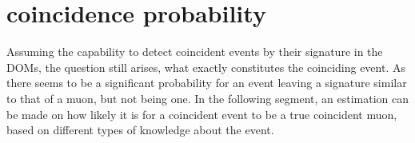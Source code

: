 \section{coincidence probability}

Assuming the capability to detect coincident events by their signature in the DOMs, the question still arises, what exactly constitutes the coinciding event. As 
there seems to be a significant probability for an event leaving a signature similar to that of a muon, but not being one. In the following segment, an estimation
can be made on how likely it is for a coincident event to be a true coincident muon, based on different types of knowledge about the event. 


